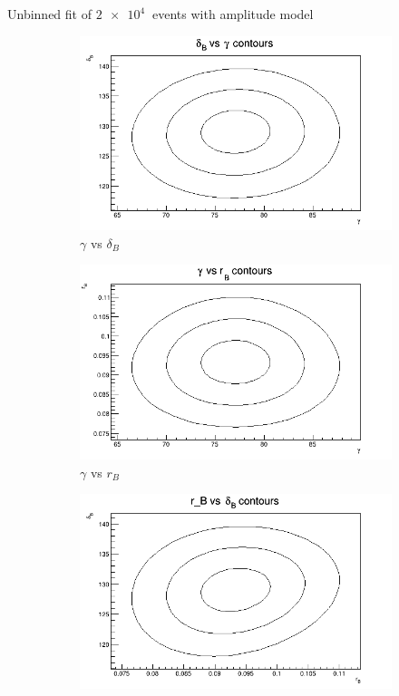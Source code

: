 \documentclass{beamer}
\begin{document}
\begin{frame}{Unbinned fit of $\SI{2e4}{}$ events with amplitude model}
  \begin{figure}
    \centering
    \vspace{-0.2cm}
    \begin{subfigure}{0.46\textwidth}
      \includegraphics[width = 1.0\textwidth]{Contour_dB_vs_gamma_10K.png}
      \caption{$\gamma$ vs $\delta_B$}
    \end{subfigure}%
    \begin{subfigure}{0.46\textwidth}
      \includegraphics[width = 1.0\textwidth]{Contour_gamma_vs_rB_10K.png}
      \caption{$\gamma$ vs $r_B$}
    \end{subfigure}
    \begin{subfigure}{0.46\textwidth}
      \includegraphics[width = 1.0\textwidth]{Contour_rB_vs_dB_10K.png}

\end{subfigure}
\end{figure}
\end{frame}
\end{document}

